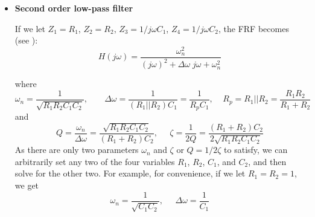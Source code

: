 \documentclass{article}
\begin{document}
\begin{itemize}
\item {\bf Second order low-pass filter}
  
  If we let $Z_1=R_1$, $Z_2=R_2$, $Z_3=1/j\omega C_1$, $Z_4=1/j\omega C_2$, 
  the FRF becomes (see
  ):
  \begin{equation}
  H(j\omega)=\frac{\omega_n^2}{(j\omega)^2+\Delta\omega\;j\omega+\omega_n^2} 
  \end{equation}
  \begin{comment}
  \begin{eqnarray}
    H&=&\frac{1/(j\omega)^2C_1C_2}
    {R_1R_2+(R_1+R_2)/j\omega C_1+1/(j\omega)^2C_1C_2}
    \nonumber \\
    &=&\frac{1/R_1R_2C_1C_2}{(j\omega)^2+j\omega(R_1+R_2)/R_1R_2C_1+1/R_1R_2C_1C_2}
    \nonumber \\
    &=&\frac{1/R_1R_2C_1C_2}{(j\omega)^2+j\omega/R_pC_1+1/R_1R_2C_1C_2}
    \nonumber \\
    &=&\frac{\omega_n^2}{(j\omega)^2+2\zeta\omega_n\;j\omega+\omega_n^2} 
    =\frac{\omega_n^2}{(j\omega)^2+\omega_n/Q \;j\omega+\omega_n^2}
    =\frac{\omega_n^2}{(j\omega)^2+\Delta\omega\;j\omega+\omega_n^2} 
  \end{eqnarray}
  \end{comment}
  where
  \begin{equation}
  \omega_n=\frac{1}{\sqrt{R_1R_2C_1C_2}},\;\;\;\;\;\;\;
  \Delta\omega=\frac{1}{(R_1||R_2)C_1}=\frac{1}{R_pC_1},\;\;\;\;
  R_p=R_1||R_2=\frac{R_1R_2}{R_1+R_2}
  \end{equation}
  and
  \begin{equation}
  Q=\frac{\omega_n}{\Delta\omega}=\frac{\sqrt{R_1R_2C_1C_2}}{(R_1+R_2)C_2},
  \;\;\;\;\;
  \zeta=\frac{1}{2Q}=\frac{(R_1+R_2)C_2}{2\sqrt{R_1R_2C_1C_2}}
  \end{equation}
  As there are only two parameters $\omega_n$ and $\zeta$ or $Q=1/2\zeta$ 
  to satisfy, we can arbitrarily set any two of the four variables $R_1$, 
  $R_2$, $C_1$, and $C_2$, and then solve for the other two. For example, 
  for convenience, if we let $R_1=R_2=1$, we get
  \begin{equation}
  \omega_n=\frac{1}{\sqrt{C_1C_2}},\;\;\;\;\;\Delta\omega=\frac{1}{C_1}
  \end{equation}
  \begin{comment}
    \begin{equation}
    \zeta=\sqrt{\frac{C_2}{C_1}}
    \end{equation}
    Solving these we get
    \begin{equation}
    C_1=\frac{1}{\omega_n\zeta},\;\;\;\;\;\;C_2=\frac{\zeta}{\omega_n}
    \end{equation}
  \end{comment}


\end{itemize}
\end{document}
